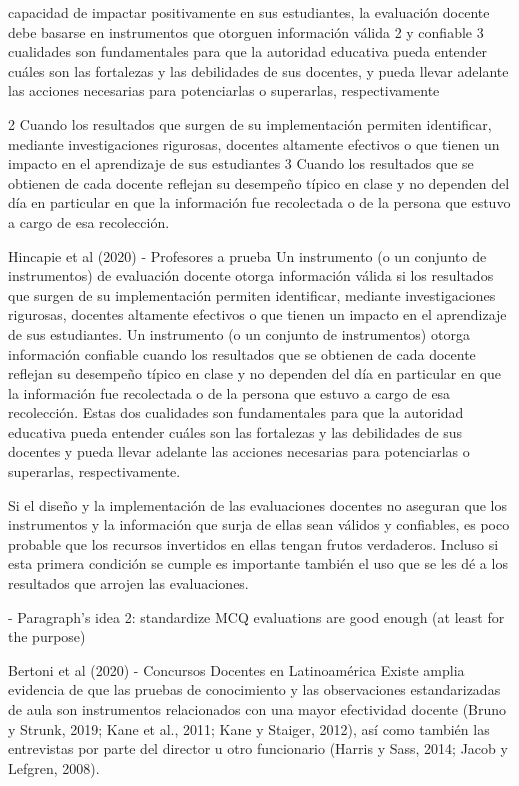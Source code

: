 capacidad de impactar positivamente en sus estudiantes, la evaluación docente debe basarse en
instrumentos que otorguen información válida 2 y confiable 3 cualidades son fundamentales para que la autoridad educativa pueda entender cuáles son las fortalezas y las debilidades de sus docentes, y pueda llevar adelante las acciones necesarias para potenciarlas o superarlas, respectivamente

2 Cuando los resultados que surgen de su implementación permiten identificar, mediante investigaciones rigurosas, docentes altamente efectivos o que tienen un impacto en el aprendizaje de sus estudiantes
3 Cuando los resultados que se obtienen de cada docente reflejan su desempeño típico en clase y no dependen del día en particular en que la información fue recolectada o de la persona que estuvo a cargo de esa recolección.


Hincapie et al (2020) - Profesores a prueba
Un instrumento (o un conjunto de instrumentos) de evaluación docente otorga información válida si los resultados que surgen de su implementación permiten identificar, mediante investigaciones rigurosas, docentes altamente efectivos o que tienen un impacto en el aprendizaje de sus estudiantes. Un instrumento (o un conjunto de instrumentos) otorga información confiable cuando los resultados que se obtienen de cada docente reflejan su desempeño típico en clase y no dependen del día en particular en que la información fue recolectada o de la persona que estuvo a cargo de esa recolección. Estas dos cualidades son fundamentales para que la autoridad educativa pueda entender cuáles son las fortalezas y las debilidades de sus docentes y pueda llevar adelante las acciones necesarias para potenciarlas o superarlas, respectivamente.


Si el diseño y la implementación de las evaluaciones docentes no aseguran que los instrumentos y la información que surja de ellas sean válidos y confiables, es poco probable que los recursos invertidos en ellas tengan frutos verdaderos. Incluso si esta primera condición se cumple es importante también el uso que se les dé a los resultados que arrojen las evaluaciones.


- Paragraph's idea 2: standardize MCQ evaluations are good enough (at least for the purpose)

Bertoni et al (2020) - Concursos Docentes en Latinoamérica
Existe amplia evidencia de que las pruebas de conocimiento y las observaciones estandarizadas de aula son instrumentos relacionados con una mayor efectividad docente (Bruno y Strunk, 2019; Kane et al., 2011; Kane y Staiger, 2012), así como también las entrevistas por parte del director u otro funcionario (Harris y Sass, 2014; Jacob y Lefgren, 2008).

